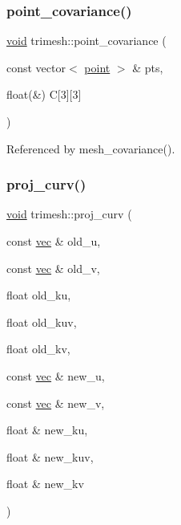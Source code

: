 \subsubsection{\texorpdfstring{point\+\_\+covariance()}{point\_covariance()}\hspace{0.1cm}{\footnotesize\ttfamily [2/2]}}
{\footnotesize\ttfamily \hyperlink{namespacetrimesh_a784ddfd979e1c579bda795a8edfc3f43}{void} trimesh\+::point\+\_\+covariance (\begin{DoxyParamCaption}\item[{const vector$<$ \hyperlink{namespacetrimesh_a325b99fd6454b22fa4c4bc3223271b2c}{point} $>$ \&}]{pts,  }\item[{float(\&)}]{C\mbox{[}3\mbox{]}\mbox{[}3\mbox{]} }\end{DoxyParamCaption})}



Referenced by mesh\+\_\+covariance().

\mbox{\label{namespacetrimesh_afa7eab0c3bb13bd1c31da85e46984a6a}} 
\subsubsection{\texorpdfstring{proj\+\_\+curv()}{proj\_curv()}}
{\footnotesize\ttfamily \hyperlink{namespacetrimesh_a784ddfd979e1c579bda795a8edfc3f43}{void} trimesh\+::proj\+\_\+curv (\begin{DoxyParamCaption}\item[{const \hyperlink{namespacetrimesh_a4fc2b83feba99c931f837a0c7d4b4df1}{vec} \&}]{old\+\_\+u,  }\item[{const \hyperlink{namespacetrimesh_a4fc2b83feba99c931f837a0c7d4b4df1}{vec} \&}]{old\+\_\+v,  }\item[{float}]{old\+\_\+ku,  }\item[{float}]{old\+\_\+kuv,  }\item[{float}]{old\+\_\+kv,  }\item[{const \hyperlink{namespacetrimesh_a4fc2b83feba99c931f837a0c7d4b4df1}{vec} \&}]{new\+\_\+u,  }\item[{const \hyperlink{namespacetrimesh_a4fc2b83feba99c931f837a0c7d4b4df1}{vec} \&}]{new\+\_\+v,  }\item[{float \&}]{new\+\_\+ku,  }\item[{float \&}]{new\+\_\+kuv,  }\item[{float \&}]{new\+\_\+kv }\end{DoxyParamCaption})}



